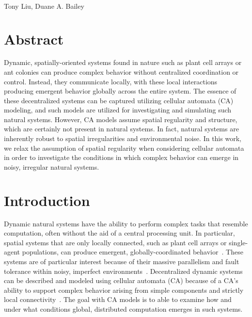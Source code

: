 \documentclass[a4paper,11pt]{article}
\begin{document}

\begin{flushleft}
{\Large
\textbf{}
}
\newline
\\
Tony Liu,
Duane A. Bailey

\end{flushleft}

\section*{Abstract}

Dynamic, spatially-oriented systems found in nature such as plant cell arrays or ant colonies can produce complex behavior without centralized coordination or control. Instead, they communicate locally, with these local interactions producing emergent behavior globally across the entire system. The essence of these decentralized systems can be captured utilizing cellular automata (CA) modeling, and such models are utilized for investigating and simulating such natural systems. However, CA models assume spatial regularity and structure, which are certainly not present in natural systems. In fact, natural systems are inherently robust to spatial irregularities and environmental noise. In this work, we relax the assumption of spatial regularity when considering cellular automata in order to investigate the conditions in which complex behavior can emerge in noisy, irregular natural systems.

\newpage

\tableofcontents
\listoffigures

\newpage
{}
\section{Introduction}
\label{sec:Intro}
Dynamic natural systems have the ability to perform complex tasks that resemble computation, often without the aid of a central processing unit. In particular, spatial systems that are only locally connected, such as plant cell arrays or single-agent populations, can produce emergent, globally-coordinated behavior~\cite{bi07, mo07}. These systems are of particular interest because of their massive parallelism and fault tolerance within noisy, imperfect environments~\cite{si99}. Decentralized dynamic systems can be described and modeled using cellular automata (CA) because of a CA's ability to support complex behavior arising from simple components and strictly local connectivity~\cite{mi96}. The goal with CA models is to able to examine how and under what conditions global, distributed computation emerges in such systems.
\end{document}

